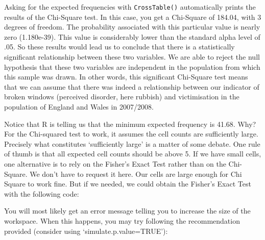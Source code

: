 \documentclass[
]{book}
\newenvironment{Shaded}{\begin{snugshade}}{\end{snugshade}}
\newcommand{\AttributeTok}[1]{\textcolor[rgb]{0.13,0.29,0.53}{#1}}
\newcommand{\ConstantTok}[1]{\textcolor[rgb]{0.56,0.35,0.01}{#1}}
\newcommand{\FunctionTok}[1]{\textcolor[rgb]{0.13,0.29,0.53}{\textbf{#1}}}
\newcommand{\NormalTok}[1]{#1}
\newcommand{\SpecialCharTok}[1]{\textcolor[rgb]{0.81,0.36,0.00}{\textbf{#1}}}
\begin{document}
Asking for the expected frequencies with \texttt{CrossTable()} automatically prints the results of the Chi-Square test. In this case, you get a Chi-Square of 184.04, with 3 degrees of freedom. The probability associated with this particular value is nearly zero (1.180e-39). This value is considerably lower than the standard alpha level of .05. So these results would lead us to conclude that there is a statistically significant relationship between these two variables. We are able to reject the null hypothesis that these two variables are independent in the population from which this sample was drawn. In other words, this significant Chi-Square test means that we can assume that there was indeed a relationship between our indicator of broken windows (perceived disorder, here rubbish) and victimisation in the population of England and Wales in 2007/2008.

Notice that R is telling us that the minimum expected frequency is 41.68. Why? For the Chi-squared test to work, it assumes the cell counts are sufficiently large. Precisely what constitutes `sufficiently large' is a matter of some debate. One rule of thumb is that all expected cell counts should be above 5. If we have small cells, one alternative is to rely on the Fisher's Exact Test rather than on the Chi-Square. We don't have to request it here. Our cells are large enough for Chi Square to work fine. But if we needed, we could obtain the Fisher's Exact Test with the following code:

\begin{Shaded}
\end{Shaded}

You will most likely get an error message telling you to increase the size of the workspace. When this happens, you may try following the recommendation provided (consider using `simulate.p.value=TRUE'):

\begin{Shaded}
\end{Shaded}
\end{document}
